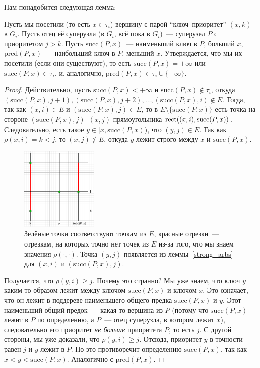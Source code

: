 Нам понадобится следующая лемма:

\begin{lemma}\label{visited_parent}
	Пусть мы посетили (то есть $x \in \tau_i$) вершину с парой ``ключ--приоритет'' $(x, k)$ в $G_i$. Пусть отец её суперузла (в $G_i$, всё пока в $G_i$)~--- суперузел $P$ с приоритетом $j > k$.
	Пусть $\mathrm{succ}(P, x)$~--- наименьший ключ в $P$, больший $x$, $\mathrm{pred}(P, x)$~--- наибольший ключ в $P$, меньший $x$.
	Утверждается, что мы их посетили (если они существуют), то есть $\mathrm{succ}(P, x) = +\infty$ или $\mathrm{succ}(P, x) \in \tau_i$, и, аналогично, $\mathrm{pred}(P, x) \in \tau_i \cup \{-\infty\}$.
\end{lemma}
\begin{proof}
	Действительно, пусть $\mathrm{succ}(P, x) < +\infty$ и $\mathrm{succ}(P, x) \notin \tau_i$, откуда $(\mathrm{succ}(P, x), j + 1), (\mathrm{succ}(P, x), j + 2), \ldots, (\mathrm{succ}(P, x), i) \notin E$. Тогда, так как $(x, i) \in E$ и $(\mathrm{succ}(P, x), j) \in E$, то в $E \setminus \{\mathrm{succ}(P, x)\}$ есть точка на стороне $(\mathrm{succ}(P, x), j)$--$(x,j)$ прямоугольника $\operatorname{rect}((x, i), \mathrm{succ}(P, x))$. Следовательно, есть такое $y \in [x, \mathrm{succ}(P, x))$, что $(y, j) \in E$. Так как $\rho(x, i) = k < j$, то $(x, j) \notin E$, откуда $y$ лежит строго между
	$x$ и $\mathrm{succ}(P, x)$.

	\begin{figure}
		\includegraphics[height=4cm]{img/lemma_proof_diagram.png}

		\caption{Зелёные точки соответствуют точкам из $E$, красные отрезки~--- отрезкам, на которых точно нет точек из $E$ из-за того, что мы знаем значения
			$\rho(\cdot, \cdot)$. Точка $(y, j)$ появляется из леммы~\ref{strong_arbs} для $(x, i)$ и
			$(\mathrm{succ}(P, x), j)$.}
	\end{figure}

	Получается, что $\rho(y, i) \geqslant j$. Почему это странно? Мы уже знаем, что ключ $y$ каким-то образом лежит между ключом $\mathrm{succ}(P, x)$ и ключом $x$. Это означает, что он лежит в поддереве наименьшего общего предка
	$\mathrm{succ}(P, x)$ и $y$. Этот наименьший общий предок~--- какая-то вершина из $P$ (потому что $\mathrm{succ}(P, x)$ лежит в $P$ по определению, а $P$~--- отец суперузла, в котором лежит $x$), следовательно его приоритет \emph{не больше} приоритета $P$, то есть $j$. С другой стороны, мы уже доказали, что $\rho(y, i) \geqslant j$. Отсюда, приоритет $y$ в точности равен $j$ и $y$ лежит в $P$. Но это противоречит определению $\mathrm{succ}(P, x)$, так как $x < y < \mathrm{succ}(P, x)$. Аналогично с $\mathrm{pred}(P, x)$.

\end{proof}

